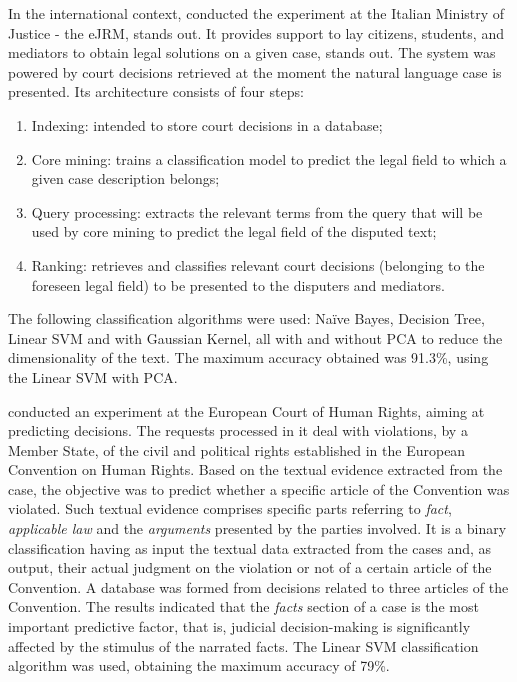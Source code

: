 In the international context, \textcite{ElJelali2015a}  conducted the experiment at the Italian Ministry of Justice - the \gls{eJRM}, stands out. It provides support to lay citizens, students, and mediators to obtain legal solutions on a given case, stands out.
The system was powered by court decisions retrieved at the moment the natural language case is presented. Its architecture consists of four steps: 
\begin{enumerate}[noitemsep]
    \item Indexing: intended to store court decisions in a database;
    \item Core mining: trains a classification model to predict the legal field to which a given case description belongs;
    \item Query processing: extracts the relevant terms from the query that will be used by core mining to predict the legal field of the disputed text;
    \item Ranking: retrieves and classifies relevant court decisions (belonging to the foreseen legal field) to be presented to the disputers and mediators. 
\end{enumerate}
The following classification algorithms were used: Naïve Bayes, Decision Tree, Linear \gls{SVM} and with Gaussian Kernel, all with and without \gls{PCA} to reduce the dimensionality of the text. The maximum accuracy obtained was 91.3\%, using the Linear \gls{SVM} with \gls{PCA}. 


\textcite{Aletras2016} conducted an experiment at the European Court of Human Rights, aiming at predicting decisions. The requests processed in it deal with violations, by a Member State, of the civil and political rights established in the European Convention on Human Rights. Based on the textual evidence extracted from the case, the objective was to predict whether a specific article of the Convention was violated. Such textual evidence  comprises specific parts referring to \textit{fact}, \textit{applicable law} and the \textit{arguments} presented by the parties involved. It is a binary classification having as input the textual data extracted from the cases and, as output, their actual judgment on the violation or not of a certain article of the Convention. A database was formed from decisions related to three articles of the Convention. The results indicated that the \textit{facts} section of a case is the most important predictive factor, that is, judicial decision-making is significantly affected by the stimulus of the narrated facts. The Linear \gls{SVM} classification algorithm was used, obtaining the maximum accuracy of 79\%. 

